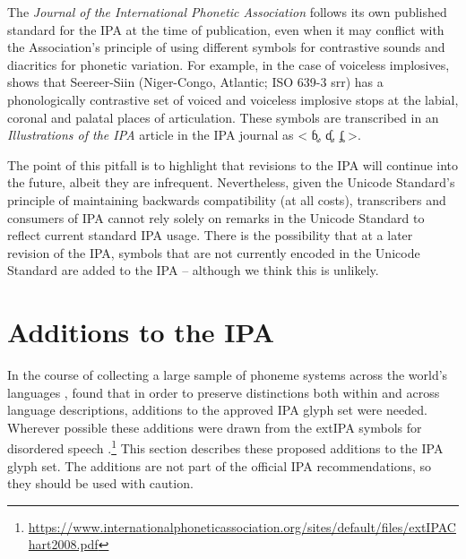 The \textit{Journal of the International Phonetic Association} follows its own 
published standard for the IPA at the time of publication, even when it 
may conflict with the Association's principle of using different symbols 
for contrastive sounds and diacritics for phonetic variation. For example, 
in the case of voiceless implosives, \citet{McLaughlin2005} shows that 
Seereer-Siin (Niger-Congo, Atlantic; ISO 639-3 srr) has a phonologically 
contrastive set of voiced and voiceless implosive stops at the labial, 
coronal and palatal places of articulation. These symbols are transcribed 
in an \textit{Illustrations of the IPA} article in the IPA journal as 
< ɓ̥, ɗ̥, ʄ̥ >.

The point of this pitfall is to highlight that revisions to the IPA will 
continue into the future, albeit they are infrequent. Nevertheless, 
given the Unicode Standard's principle of maintaining backwards compatibility 
(at all costs), transcribers and consumers of IPA cannot rely solely on 
remarks in the Unicode Standard to reflect current standard IPA usage. 
There is the possibility that at a later revision of the IPA, symbols that 
are not currently encoded in the Unicode Standard are added to the IPA -- 
although we think this is unlikely. 

\section{Additions to the IPA}
\label{ipa-additions}

In the course of collecting a large sample of phoneme systems across the world's
languages \citep{Moran2012}, \citet{Moran_etal2014} found that in order 
to preserve distinctions both within and across language descriptions, 
additions to the approved IPA glyph set were needed. Wherever possible 
these additions were drawn from the extIPA symbols for disordered
speech \citep{Duckworth_etal1990}.\footnote{\url{https://www.internationalphoneticassociation.org/sites/default/files/extIPAChart2008.pdf}}
This section describes these proposed additions to the IPA glyph set. The
additions are not part of the official IPA recommendations, so they should be 
used with caution.

